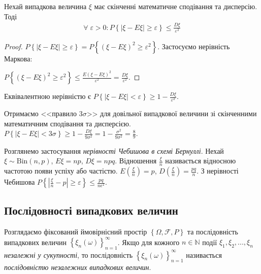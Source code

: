 \begin{theorem*}
    Нехай випадкова величина $\xi$ має скінченні математичне сподівання та дисперсію.
Тоді
\begin{gather}\label{Cheb_ineq}
    \forall \; \varepsilon >0 : P\left\{ \left|\xi - E\xi\right| \geq \varepsilon\right\} \leq \frac{D\xi}{\varepsilon^2}
\end{gather}
\end{theorem*} 
\begin{proof}
    $P\left\{ |\xi - E\xi| \geq \varepsilon\right\} = P\left\{ (\xi - E\xi)^2 \geq \varepsilon^2\right\}$.
    Застосуємо нерівність Маркова:
    
    \noindent $P\left\{ (\xi - E\xi)^2 \geq \varepsilon^2\right\} \leq \frac{E(\xi - E\xi)^2}{\varepsilon^2} = \frac{D\xi}{\varepsilon^2}$.
\end{proof}
\begin{remark}
    Еквівалентною нерівністю є $P\left\{ \left|\xi - E\xi\right| < \varepsilon\right\} \geq 1 - \frac{D\xi}{\varepsilon^2}$.
\end{remark}
\begin{example}
    Отримаємо <<правило $3 \sigma$>> для довільної випадкової величини зі скінченними математичним сподівання та дисперсією.
    $P\left\{ |\xi - E\xi| < 3 \sigma\right\} \geq 1 - \frac{D\xi}{9 \sigma^2} = 1 - \frac{\sigma^2}{9 \sigma^2} = \frac{8}{9}$.
\end{example}
Розглянемо застосування \emph{нерівності Чебишова в схемі Бернуллі}. Нехай $\xi \sim \mathrm{Bin}(n, p)$, $E\xi = np$, $D\xi = npq$.
Відношення $\frac{\xi}{n}$ називається відносною частотою появи успіху або частістю. $E\left( \frac{\xi}{n}\right) = p$, 
$D\left( \frac{\xi}{n}\right) = \frac{pq}{n}$. З нерівності Чебишова 
$P\left\{ \left|\frac{\xi}{n} - p\right| \geq \varepsilon\right\} \leq \frac{pq}{n \epsilon^2}$.

\subsection{Послідовності випадкових величин}
Розглядаємо фіксований ймовірнісний простір $\left\{ \Omega, \mathcal{F}, P\right\}$ та
послідовність випадкових величин $\left\{ \xi_n (\omega)\right\}_{n=1}^{\infty}$.
Якщо для кожного $n \in \mathbb{N}$ події $\xi_1, \xi_2, ..., \xi_n$ \emph{незалежні у сукупності},
то послідовність $\left\{ \xi_n (\omega)\right\}_{n=1}^{\infty}$ називається \emph{послідовністю незалежних випадкових величин}.

